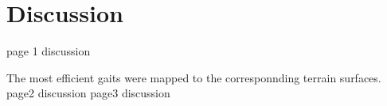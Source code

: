\chapter{Discussion} \label{chapter:07:discussion}
page 1 discussion

The most efficient gaits were mapped to the corresponnding terrain surfaces. 
\newpage
page2 discussion
\newpage
page3 discussion